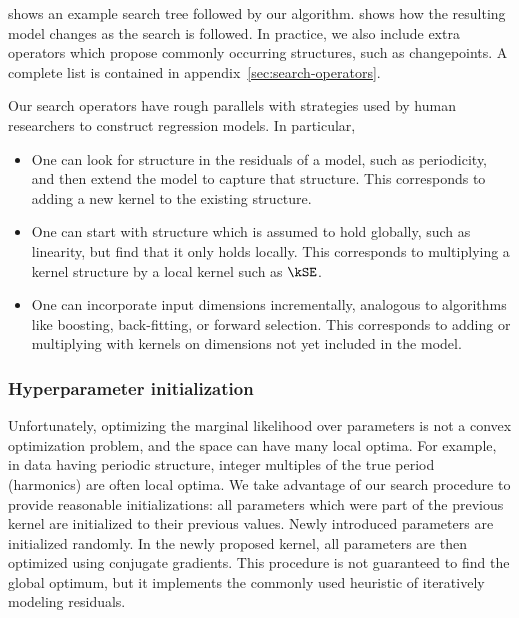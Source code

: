  shows an example search tree followed by our algorithm.
 shows how the resulting model changes as the search is followed.
In practice, we also include extra operators which propose commonly occurring structures, such as changepoints.
A complete list is contained in appendix~\ref{sec:search-operators}.

Our search operators have rough parallels with strategies used by human researchers to construct regression models.
In particular,
\begin{itemize}
\item One can look for structure in the residuals of a model, such as periodicity, and then extend the model to capture that structure.
This corresponds to adding a new kernel to the existing structure.
\item One can start with structure which is assumed to hold globally, such as linearity, but find that it only holds locally.
This corresponds to multiplying a kernel structure by a local kernel such as $\kSE$.
\item One can incorporate input dimensions incrementally, analogous to algorithms like boosting, back-fitting, or forward selection.
This corresponds to adding or multiplying with kernels on dimensions not yet included in the model.
\end{itemize}





\subsubsection{Hyperparameter initialization}

Unfortunately, optimizing the marginal likelihood over parameters is not a convex optimization problem, and the space can have many local optima.
For example, in data having periodic structure, integer multiples of the true period (harmonics) are often local optima. 
We take advantage of our search procedure to provide reasonable initializations: all parameters which were part of the previous kernel are initialized to their previous values. Newly introduced parameters are initialized randomly.
In the newly proposed kernel, all parameters are then optimized using conjugate gradients.
This procedure is not guaranteed to find the global optimum, but it implements the commonly used heuristic of iteratively modeling residuals.






